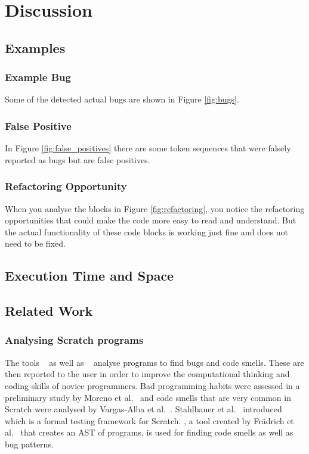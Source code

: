 \chapter{Discussion}\label{chap:discussion}

\section{Examples}
\subsection{Example Bug}
Some of the detected actual bugs are shown in Figure \ref{fig:bugs}.

\subsection{False Positive}
In Figure \ref{fig:false_positives} there are some token sequences that were falsely reported as bugs but are false positives.

\subsection{Refactoring Opportunity}
When you analyse the blocks in Figure \ref{fig:refactoring}, you notice the refactoring opportunities that could make the code more easy to read and understand. But the actual functionality of these code blocks is working just fine and does not need to be fixed.


\section{Execution Time and Space}


\section{Related Work}
\subsection{Analysing Scratch programs}\label{sec:analyzing-scratch}
The tools \drscratch{}~\cite{drscratch} as well as \hairball{}~\cite{hairball} analyse \scratch{} programs to find bugs and code smells. These are then reported to the user in order to improve the computational thinking and coding skills of novice programmers. Bad programming habits were assessed in a preliminary study by Moreno et al.~\cite{badhabits} and code smells that are very common in Scratch were analysed by Vargas-Alba et al.~\cite{badsmells}. Stahlbauer et al.~\cite{whisker} introduced \whisker{} which is a formal testing framework for Scratch. \litterbox, a tool created by Frädrich et al.~\cite{scratch_bugpatterns} that creates an AST of \scratch{} programs, is used for finding code smells as well as bug patterns.

